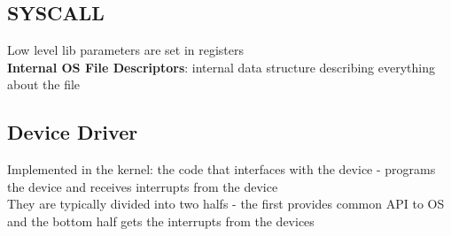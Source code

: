 \documentclass{article}
\begin{document}
\subsection{SYSCALL}
Low level lib parameters are set in registers \\
\textbf{Internal OS File Descriptors}: internal data structure describing everything about the file
\subsection{Device Driver}
Implemented in the kernel: the code that interfaces with the device - programs the device and receives interrupts from the device  \\ 
They are typically divided into two halfs - the first provides common API to OS and the bottom half gets the interrupts from the devices 
\end{document}
